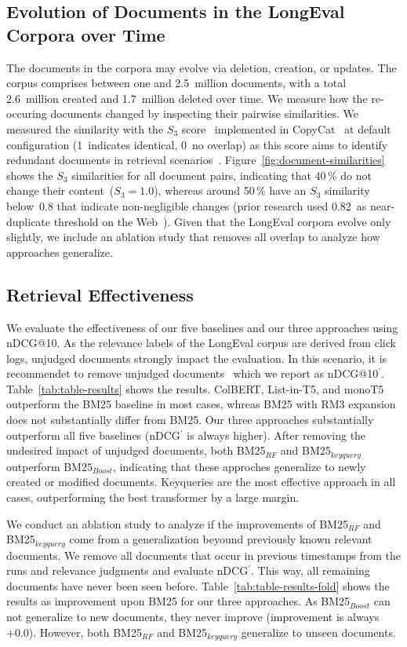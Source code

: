 \subsection{Evolution of Documents in the LongEval Corpora over Time}

The documents in the corpora may evolve via deletion, creation, or updates. The corpus comprises between one and 2.5~million documents, with a total 2.6~million created and 1.7~million deleted over time. We measure how the re-occuring documents changed by inspecting their pairwise similarities. We measured the similarity with the $S_{3}$ score~\cite{bernstein:2005} implemented in CopyCat~\cite{froebe:2021a} at default configuration (1~indicates identical, 0~no overlap) as this score aims to identify redundant documents in retrieval scenarios~\cite{bernstein:2005}. Figure~\ref{fig:document-similarities} shows the $S_{3}$ similarities for all document pairs, indicating that 40\,\% do not change their content~($S_{3}=1.0$), whereas around 50\,\% have an $S_{3}$ similarity below~0.8 that indicate non-negligible changes (prior research used 0.82~as near-duplicate threshold on the Web~\cite{froebe:2021a}). Given that the LongEval corpora evolve only slightly, we include an ablation study that removes all overlap to analyze how approaches generalize.



\subsection{Retrieval Effectiveness}


We evaluate the effectiveness of our five baselines and our three approaches using nDCG@10. As the relevance labels of the LongEval corpus are derived from click logs, unjudged documents strongly impact the evaluation. In this scenario, it is recommendet to remove unjudged documents~\cite{sakai:2007} which we report as nDCG@10$^{'}$. Table~\ref{tab:table-results} shows the results. ColBERT, List-in-T5, and monoT5 outperform the BM25 baseline in most cases, whreas BM25 with RM3 expansion does not substantially differ from BM25. Our three approaches substantially outperform all five baselines (nDCG$^{'}$ is always higher). After removing the undesired impact of unjudged documents, both BM25$_{RF}$ and BM25$_{keyquery}$ outperform BM25$_{Boost}$, indicating that these approches generalize to newly created or modified documents. Keyqueries are the most effective approach in all cases, outperforming the best transformer by a large margin.



We conduct an ablation study to analyze if the improvements of BM25$_{RF}$ and BM25$_{keyquery}$ come from a generalization beyound previously known relevant documents. We remove all documents that occur in previous timestamps from the runs and relevance judgments and evaluate nDCG$^{'}$. This way, all remaining documents have never been seen before. Table~\ref{tab:table-results-fold} shows the results as improvement upon BM25 for our three approaches. As BM25$_{Boost}$ can not generalize to new documents, they never improve (improvement is always~$+0.0$). However, both BM25$_{RF}$ and BM25$_{keyquery}$ generalize to unseen documents.
